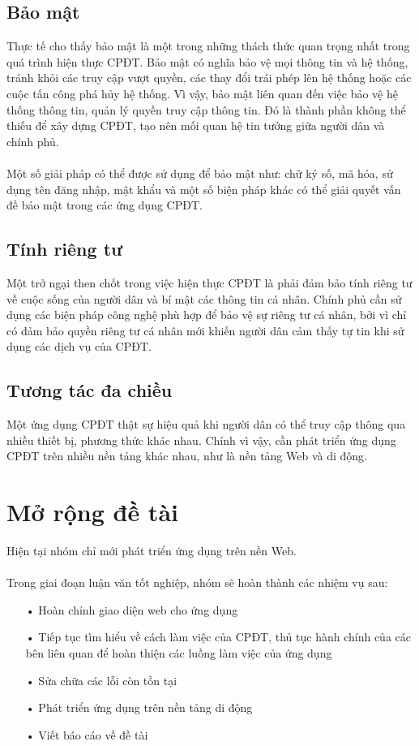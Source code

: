 \documentclass[a4paper]{article}
\begin{document}
\subsection{Bảo mật}
Thực tế cho thấy bảo mật là một trong những thách thức quan trọng nhất trong quá trình hiện thực CPĐT. Bảo mật có nghĩa bảo vệ mọi thông tin và hệ thống, tránh khỏi các truy cập vượt quyền, các thay đổi trái phép lên hệ thống hoặc các cuộc tấn công phá hủy hệ thống. Vì vậy, bảo mật liên quan đến việc bảo vệ hệ thống thông tin, quản lý quyền truy cập thông tin. Đó là thành phần không thể thiếu để xây dựng CPĐT, tạo nên mối quan hệ tin tưởng giữa người dân và chính phủ.\\
\\
Một số giải pháp có thể được sử dụng để bảo mật như: chữ ký số, mã hóa, sử dụng tên đăng nhập, mật khẩu và một số biện pháp khác có thể giải quyết vấn đề bảo mật trong các ứng dụng CPĐT.
\subsection{Tính riêng tư}
Một trở ngại then chốt trong việc hiện thực CPĐT là phải đảm bảo tính riêng tư về cuộc sống của người dân và bí mật các thông tin cá nhân. Chính phủ cần sử dụng các biện pháp công nghệ phù hợp để bảo vệ sự riêng tư cá nhân, bởi vì chỉ có đảm bảo quyền riêng tư cá nhân mới khiến người dân cảm thấy tự tin khi sử dụng các dịch vụ của CPĐT.
\subsection{Tương tác đa chiều}
Một ứng dụng CPĐT thật sự hiệu quả khi người dân có thể truy cập thông qua nhiều thiết bị, phương thức khác nhau. Chính vì vậy, cần phát triển ứng dụng CPĐT trên nhiều nền tảng khác nhau, như là nền tảng Web và di động.

\section{Mở rộng đề tài}
Hiện tại nhóm chỉ mới phát triển ứng dụng trên nền Web. \\ 
\\
Trong giai đoạn luận văn tốt nghiệp, nhóm sẽ hoàn thành các nhiệm vụ sau:
\begin{itemize}
	\item[•]Hoàn chỉnh giao diện web cho ứng dụng
	\item[•]Tiếp tục tìm hiểu về cách làm việc của CPĐT, thủ tục hành chính của các bên liên quan để hoàn thiện các luồng làm việc của ứng dụng
	\item[•]Sửa chữa các lỗi còn tồn tại
	\item[•]Phát triển ứng dụng trên nền tảng di động
	\item[•]Viết báo cáo về đề tài
\end{itemize}
\end{document}
